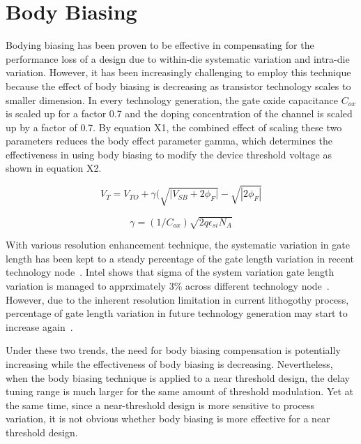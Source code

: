 \section{Body Biasing}
\label{sec:bodybiasing}

Bodying biasing has been proven to be effective in compensating for the
performance loss of a design due to within-die systematic variation and
intra-die variation. However, it has been increasingly challenging to employ
this technique because the effect of body biasing is decreasing as transistor
technology scales to smaller dimension. In every technology generation, the gate
oxide capacitance $C_{ox}$ is scaled up for a factor 0.7 and the doping
concentration of the channel is scaled up by a factor of 0.7. By equation X1,
the combined effect of scaling these two parameters reduces the body effect
parameter gamma, which determines the effectiveness in using body biasing to
modify the device threshold voltage as shown in equation X2.

\begin{equation}
V_{T} = V_{TO} + \gamma ( \sqrt{ | {V_{SB} + 2\phi_{F} | } } - \sqrt{ | 2\phi_{F} | } 
\end{equation}

\begin{equation}
\gamma = (1/C_{ox})\sqrt{2q\epsilon_{si}N_A}
\end{equation}

With various resolution enhancement technique, the systematic variation in gate length has been kept to a steady percentage of the gate length variation in recent technology node~\cite{Intel:2009}. Intel shows that sigma of the system variation gate length variation is managed to apprximately 3\% across different technology node~\cite{Intel:2009}. However, due to the inherent resolution limitation in current lithogothy process, percentage of gate length variation in future technology generation may start to increase again~\cite{OPC20}.    


Under these two trends, the need for body biasing compensation is potentially increasing
while the effectiveness of body biasing is decreasing. Nevertheless, when the
body biasing technique is applied to a near threshold design, the delay tuning
range is much larger for the same amount of threshold modulation. Yet at the
same time, since a near-threshold design is more sensitive to process variation,
it is not obvious whether body biasing is more effective for a near threshold
design. 

